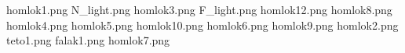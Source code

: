 homlok1.png
N_light.png
homlok3.png
F_light.png
homlok12.png
homlok8.png
homlok4.png
homlok5.png
homlok10.png
homlok6.png
homlok9.png
homlok2.png
teto1.png
falak1.png
homlok7.png
